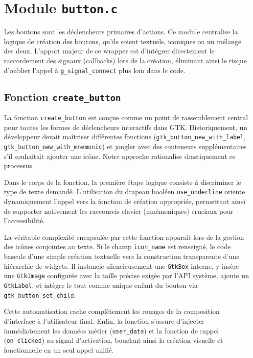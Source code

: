 \section{Module \texttt{button.c}}

Les boutons sont les déclencheurs primaires d'actions. Ce module centralise la logique de création des boutons, qu'ils soient textuels, iconiques ou un mélange des deux. L'apport majeur de ce wrapper est d'intégrer directement le raccordement des signaux (callbacks) lors de la création, éliminant ainsi le risque d'oublier l'appel à \texttt{g\_signal\_connect} plus loin dans le code.

\subsection{Fonction \texttt{create\_button}}

La fonction \texttt{create\_button} est conçue comme un point de rassemblement central pour toutes les formes de déclencheurs interactifs dans GTK. Historiquement, un développeur devait maîtriser différentes fonctions (\texttt{gtk\_button\_new\_with\_label}, \texttt{gtk\_button\_new\_with\_mnemonic}) et jongler avec des conteneurs supplémentaires s'il souhaitait ajouter une icône. Notre approche rationalise drastiquement ce processus.

Dans le corps de la fonction, la première étape logique consiste à discriminer le type de texte demandé. L'utilisation du drapeau booléen \texttt{use\_underline} oriente dynamiquement l'appel vers la fonction de création appropriée, permettant ainsi de supporter nativement les raccourcis clavier (mnémoniques) cruciaux pour l'accessibilité. 

La véritable complexité encapsulée par cette fonction apparaît lors de la gestion des icônes conjointes au texte. Si le champ \texttt{icon\_name} est renseigné, le code bascule d'une simple création textuelle vers la construction transparente d'une hiérarchie de widgets. Il instancie silencieusement une \texttt{GtkBox} interne, y insère une \texttt{GtkImage} configurée avec la taille précise exigée par l'API système, ajoute un \texttt{GtkLabel}, et intègre le tout comme unique enfant du bouton via \texttt{gtk\_button\_set\_child}. 

Cette automatisation cache complètement les rouages de la composition d'interface à l'utilisateur final. Enfin, la fonction s'assure d'injecter immédiatement les données métier (\texttt{user\_data}) et la fonction de rappel (\texttt{on\_clicked}) au signal d'activation, bouclant ainsi la création visuelle et fonctionnelle en un seul appel unifié.

